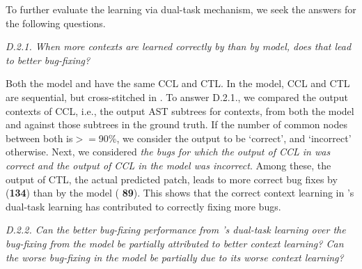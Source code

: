 To further evaluate the learning via dual-task
mechanism, we  seek the answers for the following questions.



{\em D.2.1. When more contexts are learned correctly by {\tool} than
  by  model, does that lead to better bug-fixing?}

Both the  model and {\tool} have the same CCL and
CTL. In the  model, CCL and CTL are sequential, but
cross-stitched in {\tool}. To answer D.2.1., we compared the output
contexts of CCL, i.e., the output AST subtrees for contexts, from both
the  model and {\tool} against those subtrees in the
ground truth. If the number of common nodes between both is$>=$90\%,
we consider the output to be `correct', and `incorrect'
otherwise. Next, we considered {\em the bugs for which the output of
  CCL in {\tool} was correct and the output of CCL in the
   model was incorrect}. Among these, the output
of CTL, the actual predicted patch, leads to more correct bug fixes
by {\tool} ({\bf 134}) than by the  model ({\bf
  89}). This shows that the correct context learning in {\tool}'s
dual-task learning has contributed to correctly fixing more bugs.


{\em D.2.2. Can the better bug-fixing performance from {\tool}'s
  dual-task learning over the bug-fixing from the 
  model be partially attributed to better context learning? Can the
  worse bug-fixing in the  model be partially due to
  its worse context learning?}


